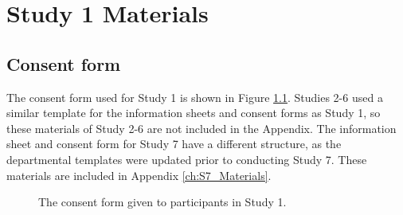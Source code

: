 \chapter{Study 1 Materials}\label{ch:S1_Materials}
\section{Consent form}\label{ch:consentform}
The consent form used for Study 1 is shown in Figure \ref{fig:consentform}. Studies 2-6 used a similar template for the information sheets and consent forms as Study 1, so these materials of Study 2-6 are not included in the Appendix. The information sheet and consent form for Study 7 have a different structure, as the departmental templates were updated prior to conducting Study 7. These materials are included in Appendix \ref{ch:S7_Materials}.

\begin{figure}[htp] 
\caption[Study 1 consent form]{The consent form given to participants in Study 1.}
\label{fig:consentform}
\end{figure} 

